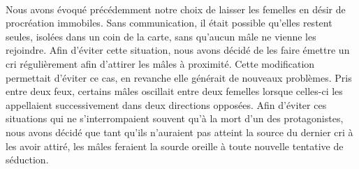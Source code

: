 \paragraph{}
Nous avons évoqué précédemment notre choix de laisser les femelles en désir de
procréation immobiles. Sans communication, il était possible qu'elles restent
seules, isolées dans un coin de la carte, sans qu'aucun mâle ne vienne les
rejoindre. Afin d'éviter cette situation, nous avons décidé de les faire émettre
un cri régulièrement afin d'attirer les mâles à proximité. Cette modification
permettait d'éviter ce cas, en revanche elle générait de nouveaux problèmes.
Pris entre deux feux, certains mâles oscillait entre deux femelles lorsque
celles-ci les appellaient successivement dans deux directions opposées. Afin
d'éviter ces situations qui ne s'interrompaient souvent qu'à la mort d'un
des protagonistes, nous avons décidé que tant qu'ils n'auraient pas atteint la
source du dernier cri à les avoir attiré, les mâles feraient la sourde oreille à
toute nouvelle tentative de séduction.
